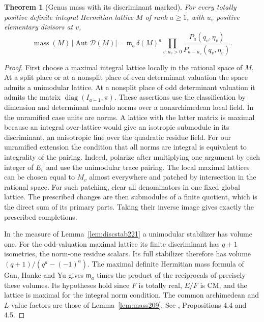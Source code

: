 \documentclass[a4paper,11pt]{article}
\newtheorem{theorem}[proposition]{Theorem}
\theoremstyle{definition}
\theoremstyle{remark}
\numberwithin{equation}{section}
\newcommand{\Aut}{\operatorname{Aut}}
\begin{document}
\begin{theorem}[Genus mass with its discriminant marked]
\label{thm:discmass221}
For every totally positive definite integral Hermitian lattice
\(M\) of rank \(a\ge1\), with \(u_v\) positive elementary
divisors at \(v\),
\begin{equation}
 \operatorname{mass}(M)\,|\Aut\mathcal D(M)|
   =\mathfrak m_a\,\delta(M)^a
            \prod_{v:u_v>0}\frac{P_a(q_v,\eta_v)}
                                   {P_{a-u_v}(q_v,\eta_v)} .
 \label{eq:markedmass221}
\end{equation}
\end{theorem}
\begin{proof}
First choose a maximal integral lattice locally in the
rational space of \(M\). At a split place or at a nonsplit
place of even determinant valuation the space admits a
unimodular lattice. At a nonsplit place of odd determinant
valuation it admits the matrix
\(\operatorname{diag}(I_{a-1},\pi)\). These assertions use
the classification by dimension and determinant modulo norms
over a nonarchimedean local field. In the unramified case
units are norms. A lattice with the latter matrix is maximal
because an integral over-lattice would give an isotropic
submodule in its discriminant, an anisotropic line over the
quadratic residue field. For our unramified extension the
condition that all norms are integral is equivalent to
integrality of the pairing. Indeed, polarize after multiplying one
argument by each integer of \(E_v\) and use the unimodular
trace pairing. The local maximal lattices can be chosen equal
to \(M_v\) almost everywhere and patched by intersection in
the rational space. For such patching, clear all denominators
in one fixed global lattice. The prescribed changes are then
submodules of a finite quotient, which is the direct sum of
its primary parts. Taking their inverse image gives exactly
the prescribed completions.

In the measure of Lemma~\ref{lem:discstab221} a unimodular
stabilizer has volume one. For the odd-valuation maximal
lattice its finite discriminant has \(q+1\) isometries, the
norm-one residue scalars. Its full stabilizer therefore has
volume \((q+1)/(q^a-(-1)^a)\). The maximal definite
Hermitian mass formula of Gan, Hanke and Yu gives
\(\mathfrak m_a\) times the product of the reciprocals of
precisely these volumes. Its hypotheses hold since \(F\)
is totally real, \(E/F\) is CM, and the lattice is maximal
for the integral norm condition. The common archimedean and
\(L\)-value factors are those of Lemma~\ref{lem:mass209}.
See \cite{XXI-XVI-IV-ghy209}, Propositions 4.4 and 4.5.


\end{proof}
\end{document}
